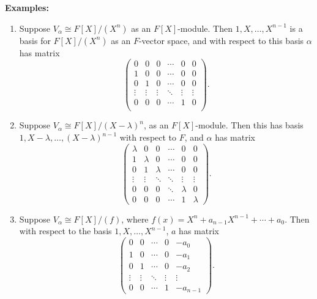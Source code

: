 \documentclass[12pt]{article}
\theoremstyle{definition}
\theoremstyle{remark}
\begin{document}
\begin{adjustbox}{minipage = \columnwidth - 25.5pt, margin=1em, frame=1pt, margin=0em}

\textbf{Examples:} 

\begin{enumerate}[label = (\roman*)]
	\item Suppose $V_{\alpha} \cong F[X] / (X^{n})$ as an $F[X]$-module. Then $1, X, \ldots, X^{n-1}$ is a basis for $F[X]/(X^{n})$ as an $F$-vector space, and with respect to this basis $\alpha$ has matrix
		\[
		\begin{pmatrix}
			0 & 0 & 0 & \cdots & 0 & 0 \\
			1 & 0 & 0 & \cdots & 0 & 0 \\
			0 & 1 & 0 & \cdots & 0 & 0 \\
			\vdots & \vdots & \vdots & \ddots & \vdots & \vdots \\
			0 & 0 & 0 & \cdots & 1 & 0 \\




		\end{pmatrix}
		.\]
	\item Suppose $V_{\alpha} \cong F[X]/(X - \lambda)^{n}$, as an $F[X]$-module. Then this has basis $1, X - \lambda, \ldots, (X - \lambda)^{n-1}$ with respect to $F$, and $\alpha$ has matrix
		\[
		\begin{pmatrix}
			\lambda & 0 & 0 & \cdots & 0 & 0 \\
			1 & \lambda & 0 & \cdots & 0 & 0 \\
			0 & 1 & \lambda & \cdots & 0 & 0 \\
			\vdots & \vdots & \ddots & \ddots & \vdots & \vdots \\
			0 & 0 & 0 & \ddots & \lambda & 0 \\
			0 & 0 & 0 & \cdots & 1 & \lambda
		\end{pmatrix}
		.\]
	\item Suppose $V_{\alpha} \cong F[X]/(f)$, where $f(x) = X^{n} + a_{n-1}X^{n-1} + \cdots + a_0$. Then with respect to the basis $1, X, \ldots, X^{n-1}$, $a$ has matrix
		\[
		\begin{pmatrix}
			0 & 0 & \cdots & 0 & -a_0 \\
			1 & 0 & \cdots & 0 & -a_1 \\
			0 & 1 & \cdots & 0 & -a_2 \\
			\vdots & \vdots & \ddots & \vdots & \vdots \\
			0 & 0 & \cdots & 1 & -a_{n-1}
		\end{pmatrix}
		.\]
\end{enumerate}

\end{adjustbox}
\end{document}
